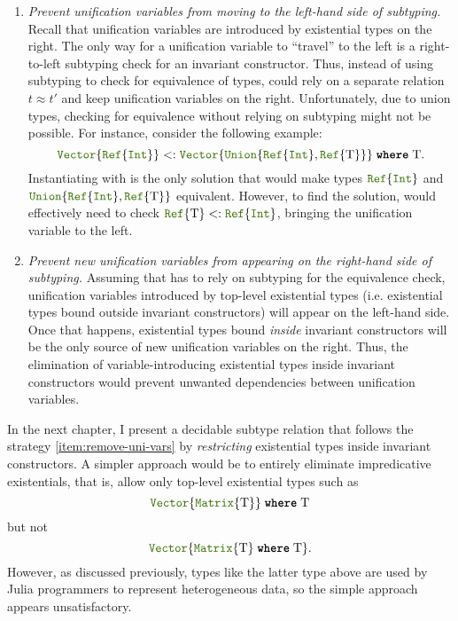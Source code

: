 \begin{enumerate}
  \item \emph{Prevent unification variables from moving to the left-hand side
    of subtyping.} Recall that unification variables are introduced by
    existential types on the right. The only way for a unification variable to
    ``travel'' to the left is a right-to-left subtyping check for an
    invariant constructor. Thus, instead of using subtyping to check for
    equivalence of types, \algo could rely on a separate relation
    $t \approx t'$ and keep unification variables on the right.
    Unfortunately, due to union types, checking for equivalence
    without relying on subtyping might not be possible.
    For instance, consider the following example:
    \[
      \vectyp{\reftyp{\inttyp}} 
      <: 
      \wheret{\vectyp{\uniontyp{\reftyp{\inttyp}, \reftyp{\T}}}}{\T}.
    \]
    Instantiating \T with \inttyp is the only solution that would make types
    $\reftyp{\inttyp}$ and $\uniontyp{\reftyp{\inttyp}, \reftyp{\T}}$
    equivalent. However, to find the solution, \algo would effectively need
    to check $\reftyp{\T} <: \reftyp{\inttyp}$, bringing the unification
    variable to the left.
  \item\label{item:remove-uni-vars} 
    \emph{Prevent new unification variables from appearing on the right-hand
    side of subtyping.} Assuming that \algo has to rely on subtyping 
    for the equivalence check, unification variables introduced by top-level
    existential types (i.e. existential types bound outside invariant
    constructors) will appear on the left-hand side. Once that happens,
    existential types bound \emph{inside} invariant constructors will be the
    only source of new unification variables on the right.
    Thus, the elimination of variable-introducing existential types inside 
    invariant constructors would prevent unwanted
    dependencies between unification variables.
\end{enumerate}

In the next chapter, I present a decidable subtype relation that
follows the strategy \ref{item:remove-uni-vars} by \emph{restricting}
existential types inside invariant constructors.
A simpler approach would be to entirely eliminate impredicative existentials,
that is, allow only top-level existential types such as
\[ \wheret{\vectyp{\mattyp{\T}}}{\T} \]
but not
\[ \vectyp{\wheret{\mattyp{\T}}{\T}}. \]
However, as discussed previously, %
types like the latter  type above are used by Julia programmers 
to represent heterogeneous data, so the simple approach appears unsatisfactory.
